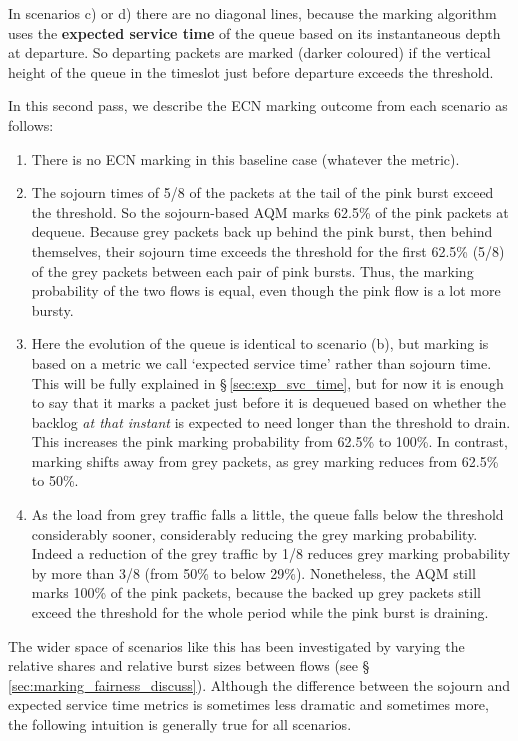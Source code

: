 In scenarios c) or d) there are no diagonal lines, because the marking algorithm uses the \textbf{expected service time} of the queue based on its instantaneous depth at departure. So departing packets are marked (darker coloured) if the vertical height of the queue in the timeslot just before departure exceeds the threshold.

In this second pass, we describe the ECN marking outcome from each scenario
as follows:
\begin{enumerate}[nosep, label=\alph*)]
	\item There is no ECN marking in this baseline case (whatever the metric).
	\item The sojourn times of 5/8 of the packets at the tail of the pink burst exceed the threshold. So the sojourn-based AQM marks 62.5\% of the pink packets at dequeue. Because grey packets back up behind the pink burst, then behind themselves, their sojourn time exceeds the threshold for the first 62.5\% (5/8) of the grey packets between each pair of pink bursts. Thus, the marking probability of the two flows is equal, even though the pink flow is a lot more bursty.
	\item Here the evolution of the queue is identical to scenario (b), but marking is based on a metric we call `expected service time' rather than sojourn time. This will be fully explained in \S\,\ref{sec:exp_svc_time}, but for now it is enough to say that it marks a packet just before it is dequeued based on whether the backlog \emph{at that instant} is expected to need longer than the threshold to drain. This increases the pink marking probability from 62.5\% to 100\%. In contrast, marking shifts away from grey packets, as grey marking reduces from 62.5\% to 50\%.
	\item As the load from grey traffic falls a little, the queue falls below the threshold considerably sooner, considerably reducing the grey marking probability. Indeed a reduction of the grey traffic by 1/8 reduces grey marking probability by more than 3/8 (from 50\% to below 29\%). Nonetheless, the AQM still marks 100\% of the pink packets, because the backed up grey packets still exceed the threshold for the whole period while the pink burst is draining.
\end{enumerate}

The wider space of scenarios like this has been investigated by varying the relative shares and relative burst sizes between flows (see \S\,\ref{sec:marking_fairness_discuss}). Although the difference between the sojourn and expected service time metrics is sometimes less dramatic and sometimes more, the following intuition is generally true for all scenarios.

